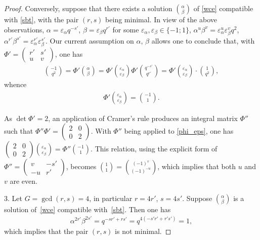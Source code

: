 \documentclass[10pt,a4paper]{amsart}
\numberwithin{equation}{section}
\begin{document}
\begin{proof}
Conversely, suppose that there exists a solution $\binom{\alpha}{\beta}$ of \eqref{wce} compatible with \eqref{sbt}, with the pair $(r,s)$ being minimal. In view of the above observations, $\alpha=\varepsilon_\alpha q^{-s'}$, $\beta=\varepsilon_\beta q^{r'}$ for some $\varepsilon_\alpha,\varepsilon_\beta\in\{-1;1\}$, $\alpha^u\beta^v=\varepsilon_\alpha^u\varepsilon_\beta^v q^2$, $\alpha^{r'}\beta^{s'}=\varepsilon_\alpha^{r'}\varepsilon_\beta^{s'}$. Our current assumption on $\alpha$, $\beta$ allows one to conclude that, with $\Phi'=\left(\begin{smallmatrix}r' & s'\\ u & v\end{smallmatrix}\right)$, one has
\begin{gather*}
\binom{-1}{q^2}=\Phi'\binom{\alpha}{\beta}=
\Phi'\binom{\varepsilon_\alpha}{\varepsilon_\beta}\Phi'\binom{q^{-s'}}{q^{r'}}
=\Phi'\binom{\varepsilon_\alpha}{\varepsilon_\beta}\cdot\binom{1}{q^2},
\end{gather*}
whence
\begin{gather}\label{phi_eps}
\Phi'\binom{\varepsilon_\alpha}{\varepsilon_\beta}=\binom{-1}1. \end{gather}

As $\det\Phi'=2$, an application of Cramer's rule produces an integral matrix $\Phi''$ such that $\Phi''\Phi'=\left(\begin{smallmatrix}2 & 0\\ 0 & 2\end{smallmatrix}\right)$. With $\Phi''$ being applied to \eqref{phi_eps}, one has $\left(\begin{smallmatrix}2 & 0\\ 0 & 2\end{smallmatrix}\right) \binom{\varepsilon_\alpha}{\varepsilon_\beta}=\Phi''\binom{-1}1$. This relation, using the explicit form of $\Phi''=\left(\begin{smallmatrix}v & -s'\\ -u & r'\end{smallmatrix}\right)$, becomes $\binom11=\binom{(-1)^v}{(-1)^{-u}}$, which implies that both $u$ and $v$ are even.

3. Let $G=\operatorname{gcd}(r,s)=4$, in particular $r=4r'$, $s=4s'$. Suppose $\binom{\alpha}{\beta}$ is a solution of~\eqref{wce} compatible with~\eqref{sbt}. Then one has
\begin{gather*}\alpha^{2r'}\beta^{2s'}=q^{-sr'+rs'}=q^{4(-s'r'+r's')}=1,\end{gather*}
which implies that the pair $(r,s)$ is not minimal.
\end{proof}
\end{document}
